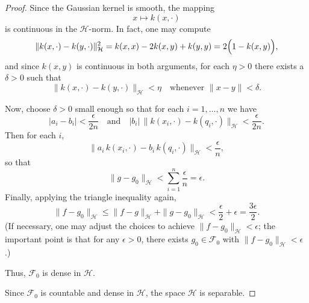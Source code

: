 \begin{proof}
Since the Gaussian kernel is smooth, the mapping
\[
x \mapsto k(x,\cdot)
\]
is continuous in the $\mathcal{H}$-norm. In fact, one may compute
\[
\|k(x,\cdot) - k(y,\cdot)\|_{\mathcal{H}}^2 = k(x,x) - 2k(x,y) + k(y,y) = 2\Bigl(1 - k(x,y)\Bigr),
\]
and since $k(x,y)$ is continuous in both arguments, for each $\eta>0$ there exists a $\delta>0$ such that
\[
\|k(x,\cdot)- k(y,\cdot)\|_{\mathcal{H}} < \eta \quad \text{whenever } \|x-y\|<\delta.
\]

Now, choose $\delta>0$ small enough so that for each $i=1,\dots,n$ we have
\[
|a_i - b_i| < \frac{\epsilon}{2n} \quad \text{and} \quad |b_i|\, \|k(x_i,\cdot)- k(q_i,\cdot)\|_{\mathcal{H}} < \frac{\epsilon}{2n}.
\]
Then for each $i$,
\[
\|a_i\, k(x_i,\cdot) - b_i\, k(q_i,\cdot)\|_{\mathcal{H}} < \frac{\epsilon}{n},
\]
so that
\[
\|g - g_0\|_{\mathcal{H}} < \sum_{i=1}^n \frac{\epsilon}{n} = \epsilon.
\]
Finally, applying the triangle inequality again,
\[
\|f-g_0\|_{\mathcal{H}} \le \|f-g\|_{\mathcal{H}} + \|g-g_0\|_{\mathcal{H}} < \frac{\epsilon}{2} + \epsilon = \frac{3\epsilon}{2}.
\]
(If necessary, one may adjust the choices to achieve $\|f-g_0\|_{\mathcal{H}} < \epsilon$; the important point is that for any $\epsilon>0$, there exists $g_0\in \mathcal{F}_0$ with $\|f-g_0\|_{\mathcal{H}} < \epsilon$.)

Thus, $\mathcal{F}_0$ is dense in $\mathcal{H}$.

Since $\mathcal{F}_0$ is countable and dense in $\mathcal{H}$, the space $\mathcal{H}$ is separable.
\end{proof}

